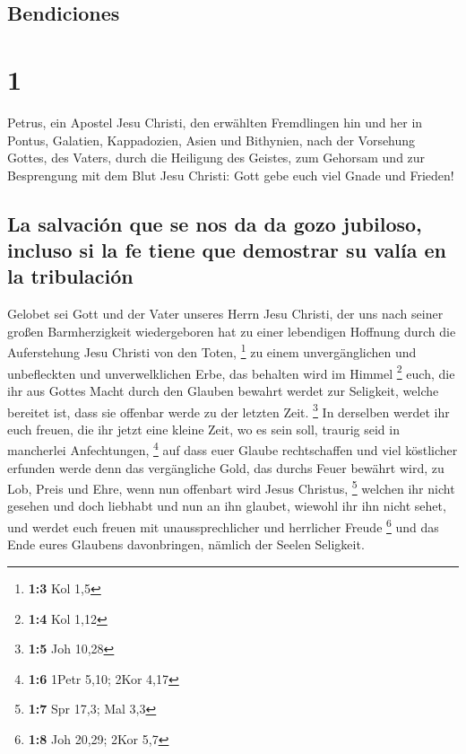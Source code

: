 \hypertarget{bendiciones}{%
\subsection{Bendiciones}\label{bendiciones}}

\hypertarget{section}{%
\section{1}\label{section}}

 Petrus, ein Apostel Jesu Christi, den erwählten
Fremdlingen hin und her in Pontus, Galatien, Kappadozien, Asien und
Bithynien,  nach der Vorsehung Gottes, des Vaters, durch
die Heiligung des Geistes, zum Gehorsam und zur Besprengung mit dem Blut
Jesu Christi: Gott gebe euch viel Gnade und Frieden!

\hypertarget{la-salvaciuxf3n-que-se-nos-da-da-gozo-jubiloso-incluso-si-la-fe-tiene-que-demostrar-su-valuxeda-en-la-tribulaciuxf3n}{%
\subsection{La salvación que se nos da da gozo jubiloso, incluso si la
fe tiene que demostrar su valía en la
tribulación}\label{la-salvaciuxf3n-que-se-nos-da-da-gozo-jubiloso-incluso-si-la-fe-tiene-que-demostrar-su-valuxeda-en-la-tribulaciuxf3n}}

 Gelobet sei Gott und der Vater unseres Herrn Jesu
Christi, der uns nach seiner großen Barmherzigkeit wiedergeboren hat zu
einer lebendigen Hoffnung durch die Auferstehung Jesu Christi von den
Toten, \footnote{\textbf{1:3} Kol 1,5}  zu einem
unvergänglichen und unbefleckten und unverwelklichen Erbe, das behalten
wird im Himmel \footnote{\textbf{1:4} Kol 1,12}  euch, die
ihr aus Gottes Macht durch den Glauben bewahrt werdet zur Seligkeit,
welche bereitet ist, dass sie offenbar werde zu der letzten Zeit.
\footnote{\textbf{1:5} Joh 10,28}  In derselben werdet ihr
euch freuen, die ihr jetzt eine kleine Zeit, wo es sein soll, traurig
seid in mancherlei Anfechtungen, \footnote{\textbf{1:6} 1Petr 5,10; 2Kor
  4,17}  auf dass euer Glaube rechtschaffen und viel
köstlicher erfunden werde denn das vergängliche Gold, das durchs Feuer
bewährt wird, zu Lob, Preis und Ehre, wenn nun offenbart wird Jesus
Christus, \footnote{\textbf{1:7} Spr 17,3; Mal 3,3} 
welchen ihr nicht gesehen und doch liebhabt und nun an ihn glaubet,
wiewohl ihr ihn nicht sehet, und werdet euch freuen mit
unaussprechlicher und herrlicher Freude \footnote{\textbf{1:8} Joh
  20,29; 2Kor 5,7}  und das Ende eures Glaubens
davonbringen, nämlich der Seelen Seligkeit.

